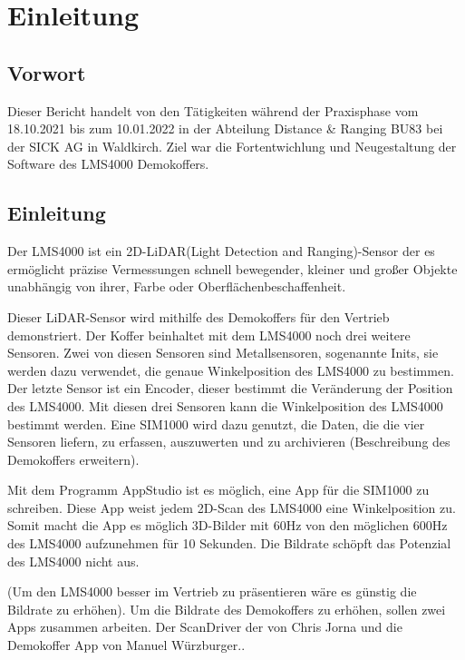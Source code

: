 
\chapter{Einleitung}
\doublespacing
\section{Vorwort}
Dieser Bericht handelt von den Tätigkeiten während der Praxisphase vom 18.10.2021
bis zum 10.01.2022 in der Abteilung Distance & Ranging BU83 bei der
SICK AG in Waldkirch. Ziel war die Fortentwichlung und Neugestaltung der Software des LMS4000 Demokoffers.



\section{Einleitung}
Der LMS4000 ist ein 2D-LiDAR(Light Detection and Ranging)-Sensor der es ermöglicht präzise Vermessungen schnell bewegender, kleiner und großer Objekte unabhängig von ihrer, Farbe oder Oberflächenbeschaffenheit.

Dieser LiDAR-Sensor wird mithilfe des Demokoffers für den Vertrieb demonstriert. Der Koffer beinhaltet mit dem LMS4000 noch drei weitere Sensoren. Zwei von diesen Sensoren sind Metallsensoren, sogenannte Inits, sie werden dazu verwendet, die genaue Winkelposition des LMS4000 zu bestimmen. Der letzte Sensor ist ein Encoder, dieser bestimmt die Veränderung der Position des LMS4000. Mit diesen drei Sensoren kann die Winkelposition des LMS4000 bestimmt werden. Eine SIM1000 wird dazu genutzt, die Daten, die die vier Sensoren liefern, zu erfassen, auszuwerten und zu archivieren (Beschreibung des Demokoffers erweitern).

Mit dem Programm AppStudio ist es möglich, eine App für die SIM1000 zu schreiben. Diese App weist jedem 2D-Scan des LMS4000 eine Winkelposition zu. Somit macht die App es möglich 3D-Bilder mit 60Hz von den möglichen 600Hz des LMS4000 aufzunehmen für 10 Sekunden. Die Bildrate schöpft das Potenzial des LMS4000 nicht aus.

(Um den LMS4000 besser im Vertrieb zu präsentieren wäre es günstig die Bildrate zu erhöhen). Um die Bildrate des Demokoffers zu erhöhen, sollen zwei Apps zusammen arbeiten. Der ScanDriver der von Chris Jorna und die Demokoffer App von Manuel Würzburger..\cite{Ansmann.op.1997,Basler.2016,Fujii.2005,Ierusalimschy.op.2016,Ierusalimschy.2006,Jung.2007,Kuhnel.2012,.,Martin.2013,Young.2014}

